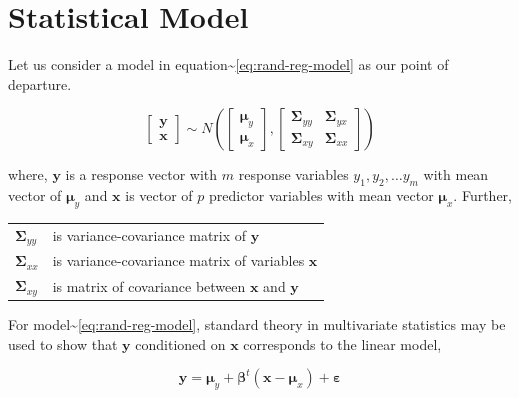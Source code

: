 \documentclass[12pt,A4paper,authoryear]{elsarticle} %
\theoremstyle{definition}
\theoremstyle{definition}
\theoremstyle{remark}
\begin{document}
\section{Statistical Model}\label{statistical-model}

Let us consider a model in
equation\textasciitilde{}\eqref{eq:rand-reg-model} as our point of
departure.

\begin{equation}
  \begin{bmatrix}\mathbf{y}\\ \mathbf{x}\end{bmatrix} \sim N
  \left(
    \begin{bmatrix}
      \boldsymbol{\mu}_y \\
      \boldsymbol{\mu}_x
    \end{bmatrix},
    \begin{bmatrix}
      \boldsymbol{\Sigma}_{yy} & \boldsymbol{\Sigma}_{yx} \\
      \boldsymbol{\Sigma}_{xy} & \boldsymbol{\Sigma}_{xx}
    \end{bmatrix}
  \right)
  \label{eq:rand-reg-model}
\end{equation}

where, \(\mathbf{y}\) is a response vector with \(m\) response variables
\(y_1, y_2, \ldots y_m\) with mean vector of \(\boldsymbol{\mu}_y\) and
\(\mathbf{x}\) is vector of \(p\) predictor variables with mean vector
\(\boldsymbol{\mu}_x\). Further,

\begin{longtable}[]{@{}ll@{}}
\toprule
\(\boldsymbol{\Sigma}_{yy}\) & is variance-covariance matrix of
\(\mathbf{y}\)\tabularnewline
\(\boldsymbol{\Sigma}_{xx}\) & is variance-covariance matrix of
variables \(\mathbf{x}\)\tabularnewline
\(\boldsymbol{\Sigma}_{xy}\) & is matrix of covariance between
\(\mathbf{x}\) and \(\mathbf{y}\)\tabularnewline
\bottomrule
\end{longtable}

\addtocounter{table}{-1}

For model\textasciitilde{}\eqref{eq:rand-reg-model}, standard theory in
multivariate statistics may be used to show that \(\mathbf{y}\)
conditioned on \(\mathbf{x}\) corresponds to the linear model,

\begin{equation}
\mathbf{y} = \boldsymbol{\mu}_y + \boldsymbol{\beta}^t (\mathbf{x} - \boldsymbol{\mu}_x) + \boldsymbol{\varepsilon}
  \label{eq:linear-model}
\end{equation}
\end{document}
